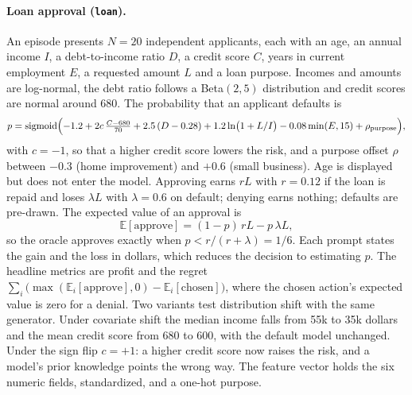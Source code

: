 \paragraph{Loan approval (\texttt{loan}).}
An episode presents $N=20$ independent applicants, each with an age, an annual income $I$, a debt-to-income ratio $D$, a credit score $C$, years in current employment $E$, a requested amount $L$ and a loan purpose. Incomes and amounts are log-normal, the debt ratio follows a Beta$(2,5)$ distribution and credit scores are normal around 680. The probability that an applicant defaults is
\begin{equation}
\label{eq:loan}
p = \operatorname{sigmoid}\Bigl(-1.2 + 2c\,\tfrac{C-680}{70} + 2.5\,(D-0.28) + 1.2\ln\bigl(1+L/I\bigr) - 0.08\min(E,15) + \rho_{\text{purpose}}\Bigr),
\end{equation}
with $c=-1$, so that a higher credit score lowers the risk, and a purpose offset $\rho$ between $-0.3$ (home improvement) and $+0.6$ (small business). Age is displayed but does not enter the model. Approving earns $rL$ with $r=0.12$ if the loan is repaid and loses $\lambda L$ with $\lambda=0.6$ on default; denying earns nothing; defaults are pre-drawn. The expected value of an approval is
\begin{equation}
\mathbb{E}[\text{approve}] = (1-p)\,rL - p\,\lambda L,
\end{equation}
so the oracle approves exactly when $p < r/(r+\lambda) = 1/6$. Each prompt states the gain and the loss in dollars, which reduces the decision to estimating $p$. The headline metrics are profit and the regret $\sum_i\bigl(\max(\mathbb{E}_i[\text{approve}],0)-\mathbb{E}_i[\text{chosen}]\bigr)$, where the chosen action's expected value is zero for a denial. Two variants test distribution shift with the same generator. Under covariate shift the median income falls from 55k to 35k dollars and the mean credit score from 680 to 600, with the default model unchanged. Under the sign flip $c=+1$: a higher credit score now raises the risk, and a model's prior knowledge points the wrong way. The feature vector holds the six numeric fields, standardized, and a one-hot purpose.

